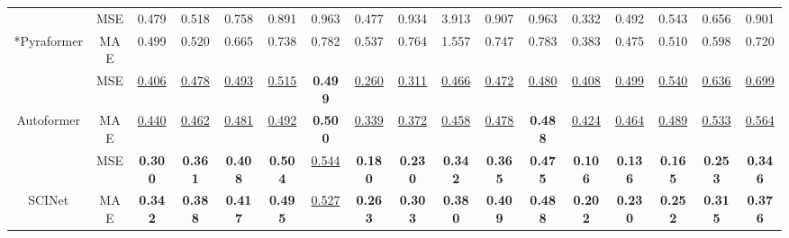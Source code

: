 \documentclass{article}
\begin{document}
\begin{table*}[htbp]
\begin{threeparttable}
{\begin{tabular}{c|c|c|c|c|c|c|c|c|c|c|c|c|c|c|c|c}
 & MSE & 0.479 & 0.518 & 0.758 & 0.891 & 0.963 & 0.477 & 0.934 & 3.913 & 0.907 & 0.963 & 0.332 & 0.492 & 0.543 & 0.656 & 0.901 \\
\multirow{-2}{*}{*Pyraformer~\cite{Liu2022Pyraformer}} & MAE & 0.499 & 0.520 & 0.665 & 0.738 & 0.782 & 0.537 & 0.764 & 1.557 & 0.747 & 0.783 & 0.383 & 0.475 & 0.510 & 0.598 & 0.720 \\ \hline
 & MSE & {\color[RGB]{0, 100, 148} \underline{0.406}} & {\color[RGB]{0, 100, 148} \underline{0.478}} & {\color[RGB]{0, 100, 148} \underline{0.493}} & {\color[RGB]{0, 100, 148} \underline{0.515}} & \textbf{0.499} & {\color[RGB]{0, 100, 148} \underline{0.260}} & {\color[RGB]{0, 100, 148} \underline{0.311}} & {\color[RGB]{0, 100, 148} \underline{0.466}} & {\color[RGB]{0, 100, 148} \underline{0.472}} & {\color[RGB]{0, 100, 148} \underline{0.480}} & {\color[RGB]{0, 100, 148} \underline{0.408}} & {\color[RGB]{0, 100, 148} \underline{0.499}} & {\color[RGB]{0, 100, 148} \underline{0.540}} & {\color[RGB]{0, 100, 148} \underline{0.636}} & {\color[RGB]{0, 100, 148} \underline{0.699}} \\
\multirow{-2}{*}{Autoformer~\cite{Wu2021AutoformerDT}} & MAE & {\color[RGB]{0, 100, 148} \underline{0.440}} & {\color[RGB]{0, 100, 148} \underline{0.462}} & {\color[RGB]{0, 100, 148} \underline{0.481}} & {\color[RGB]{0, 100, 148} \underline{0.492}} & \textbf{0.500} & {\color[RGB]{0, 100, 148} \underline{0.339}} & {\color[RGB]{0, 100, 148} \underline{0.372}} & {\color[RGB]{0, 100, 148} \underline{0.458}} & {\color[RGB]{0, 100, 148} \underline{0.478}} & \textbf{0.488} & {\color[RGB]{0, 100, 148} \underline{0.424}} & {\color[RGB]{0, 100, 148} \underline{0.464}} & {\color[RGB]{0, 100, 148} \underline{0.489}} & {\color[RGB]{0, 100, 148} \underline{0.533}} & {\color[RGB]{0, 100, 148} \underline{0.564}} \\ \hline
 & MSE & \textbf{0.300} & \textbf{0.361} & \textbf{0.408} & \textbf{0.504} & {\color[RGB]{0, 100, 148} \underline{0.544}} & \textbf{0.180} & \textbf{0.230} & \textbf{0.342} & \textbf{0.365} & \textbf{0.475} & \textbf{0.106} & \textbf{0.136} & \textbf{0.165} & \textbf{0.253} & \textbf{0.346} \\
\multirow{-2}{*}{SCINet} & MAE & \textbf{0.342} & \textbf{0.388} & \textbf{0.417} & \textbf{0.495} & {\color[RGB]{0, 100, 148} \underline{0.527}} & \textbf{0.263} & \textbf{0.303} & \textbf{0.380} & \textbf{0.409} & \textbf{0.488} & \textbf{0.202} & \textbf{0.230} & \textbf{0.252} & \textbf{0.315} & \textbf{0.376} \\ \hline

\end{tabular}}
\end{threeparttable}
\end{table*}
\end{document}
